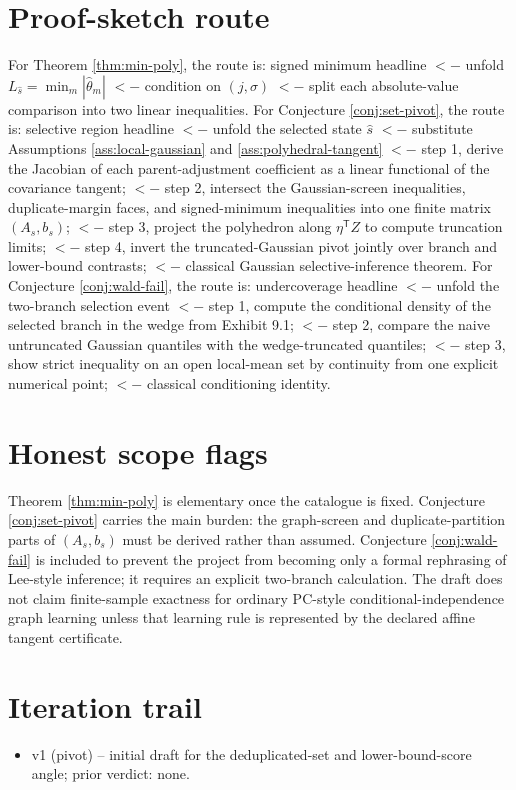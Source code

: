 \documentclass[11pt]{article}
\newcommand{\transpose}{\mathsf{T}}
\theoremstyle{definition}
\theoremstyle{plain}
\theoremstyle{remark}
\begin{document}
\section{Proof-sketch route}
For Theorem \ref{thm:min-poly}, the route is: signed minimum headline $<-$ unfold $L_{\widehat s}=\min_m|\widehat\theta_m|$ $<-$ condition on $(j,\sigma)$ $<-$ split each absolute-value comparison into two linear inequalities. For Conjecture \ref{conj:set-pivot}, the route is: selective region headline $<-$ unfold the selected state $\widehat s$ $<-$ substitute Assumptions \ref{ass:local-gaussian} and \ref{ass:polyhedral-tangent} $<-$ step 1, derive the Jacobian of each parent-adjustment coefficient as a linear functional of the covariance tangent; $<-$ step 2, intersect the Gaussian-screen inequalities, duplicate-margin faces, and signed-minimum inequalities into one finite matrix $(A_s,b_s)$; $<-$ step 3, project the polyhedron along $\eta^\transpose Z$ to compute truncation limits; $<-$ step 4, invert the truncated-Gaussian pivot jointly over branch and lower-bound contrasts; $<-$ classical Gaussian selective-inference theorem. For Conjecture \ref{conj:wald-fail}, the route is: undercoverage headline $<-$ unfold the two-branch selection event $<-$ step 1, compute the conditional density of the selected branch in the wedge from Exhibit 9.1; $<-$ step 2, compare the naive untruncated Gaussian quantiles with the wedge-truncated quantiles; $<-$ step 3, show strict inequality on an open local-mean set by continuity from one explicit numerical point; $<-$ classical conditioning identity.

\section{Honest scope flags}
Theorem \ref{thm:min-poly} is elementary once the catalogue is fixed. Conjecture \ref{conj:set-pivot} carries the main burden: the graph-screen and duplicate-partition parts of $(A_s,b_s)$ must be derived rather than assumed. Conjecture \ref{conj:wald-fail} is included to prevent the project from becoming only a formal rephrasing of Lee-style inference; it requires an explicit two-branch calculation. The draft does not claim finite-sample exactness for ordinary PC-style conditional-independence graph learning unless that learning rule is represented by the declared affine tangent certificate.

\section{Iteration trail}
\begin{itemize}[leftmargin=*]
\item v1 (pivot) -- initial draft for the deduplicated-set and lower-bound-score angle; prior verdict: none.
\end{itemize}
\end{document}
